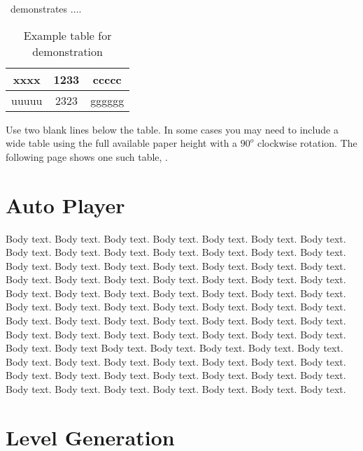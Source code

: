 ~demonstrates $\ldots$.


\begin{table}
 \label{table:l1}
 \centering
 \caption{Example table for demonstration}
 \begin{tabular}{|c|c|c|}\\
 xxxx & 1233 & ccccc\\ \hline
 uuuuu & 2323 & gggggg\\ \hline
 \end{tabular}

\end{table}

						
					


Use two blank lines below the table. In some cases you may need to include a wide table using the full available paper height with a $90^{o}$ clockwise rotation. 
The following page shows one such table, .


\begin{landscape}
\end{landscape}


\section{Auto Player}

Body text. Body text. Body text. Body text. Body text. Body text. Body text. Body text. Body text. Body text. Body text. Body text. Body text. Body text. Body text. Body text. Body text. Body text. Body text. Body text. Body text. Body text. Body text. Body text. Body text. Body text. Body text. Body text. Body text. Body text. Body text. Body text. Body text. Body text. Body text. Body text. Body text. Body text. Body text. Body text. Body text. Body text. Body text. Body text. Body text. Body text. Body text. Body text. Body text. Body text. Body text. Body text. Body text. Body text. Body text. Body text. Body text. Body text
Body text. Body text. Body text. Body text. Body text. Body text. Body text. Body text. Body text. Body text. Body text. Body text. Body text. Body text. Body text. Body text. Body text. Body text. Body text. Body text. Body text. Body text. Body text. Body text. Body text. Body text.

\section{Level Generation}
